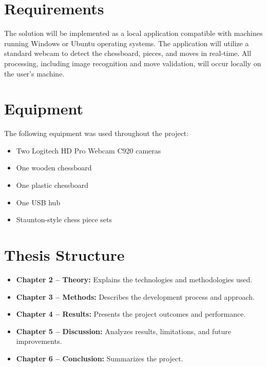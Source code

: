 \section{Requirements}

The solution will be implemented as a local application compatible with machines running Windows or Ubuntu operating systems. The application will utilize a standard webcam to detect the chessboard, pieces, and moves in real-time. All processing, including image recognition and move validation, will occur locally on the user's machine.

\section{Equipment}
The following equipment was used throughout the project:

\begin{itemize}
    \item Two Logitech HD Pro Webcam C920 cameras
    \item One wooden chessboard
    \item One plastic chessboard
    \item One USB hub
    \item Staunton-style chess piece sets
\end{itemize}


\section{Thesis Structure}

\begin{itemize}
    
    \item \textbf{Chapter 2 -- Theory:} Explains the technologies and methodologies used.
    
    \item \textbf{Chapter 3 -- Methods:} Describes the development process and approach.
    
    \item \textbf{Chapter 4 -- Results:} Presents the project outcomes and performance.
    
    \item \textbf{Chapter 5 -- Discussion:} Analyzes results, limitations, and future improvements.
    
    \item \textbf{Chapter 6 -- Conclusion:} Summarizes the project.
\end{itemize}